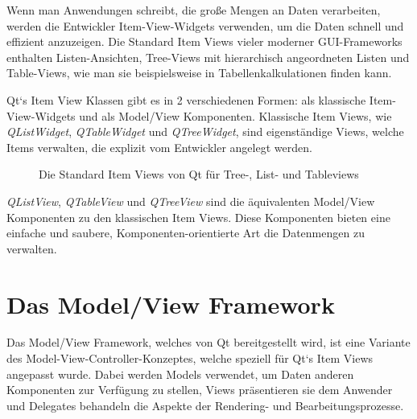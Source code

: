 \documentclass[11pt,a4paper,titlepage]{scrreprt}
\begin{document}
Wenn man Anwendungen schreibt, die große Mengen an Daten verarbeiten, werden die
Entwickler Item-View-Widgets verwenden, um die Daten schnell und effizient anzuzeigen.
Die Standard Item Views vieler moderner GUI-Frameworks enthalten Listen-Ansichten,
Tree-Views mit hierarchisch angeordneten Listen und Table-Views, wie man sie 
beispielsweise in Tabellenkalkulationen finden kann.

Qt`s Item View Klassen gibt es in 2 verschiedenen Formen: als klassische Item-View-Widgets
und als Model/View Komponenten. Klassische Item Views, wie {\itshape QListWidget}, 
{\itshape QTableWidget} und {\itshape QTreeWidget}, sind eigenständige Views, welche Items
verwalten, die explizit vom Entwickler angelegt werden.

\enlargethispage{1cm}
\begin{figure}[h]
\caption{Die Standard Item Views von Qt für Tree-, List- und Tableviews}
\end{figure}

{\itshape QListView}, {\itshape QTableView} und {\itshape QTreeView} sind die äquivalenten
Model/View Komponenten zu den klassischen Item Views. Diese Komponenten bieten eine
einfache und saubere, Komponenten-orientierte Art die Datenmengen zu verwalten.

\section{Das Model/View Framework}
Das Model/View Framework, welches von Qt bereitgestellt wird, ist eine Variante des
Model-View-Controller-Konzeptes, welche speziell für Qt`s Item Views angepasst wurde.
Dabei werden Models verwendet, um Daten anderen Komponenten zur Verfügung zu stellen,
Views präsentieren sie dem Anwender und Delegates behandeln die Aspekte der
Rendering- und Bearbeitungsprozesse.
\end{document}
